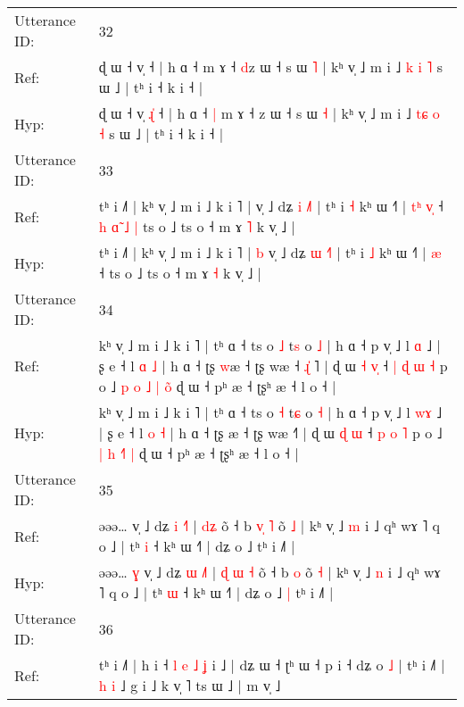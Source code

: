 \documentclass[10pt]{article}
\DeclareRobustCommand{\hl}[1]{{\textcolor{red}{#1}}}
\begin{document}
\begin{longtable}{ll}
 \\
\midrule
Utterance ID: & 32 \\
Ref: & ɖ ɯ ˧ v̩\hl{}\hl{}\hl{} ˧ | h ɑ ˧\hl{}\hl{} m ɤ ˧ \hl{d}z ɯ ˧ s ɯ \hl{˥} | kʰ v̩ ˩ m i ˩ \hl{}\hl{k} \hl{i} \hl{˥} s ɯ ˩ | tʰ i ˧ k i ˧ |
 \\
Hyp: & ɖ ɯ ˧ v̩\hl{ }\hl{ɻ}\hl{̍} ˧ | h ɑ ˧\hl{ }\hl{|} m ɤ ˧ \hl{}z ɯ ˧ s ɯ \hl{˧} | kʰ v̩ ˩ m i ˩ \hl{t}\hl{ɕ} \hl{o} \hl{˧} s ɯ ˩ | tʰ i ˧ k i ˧ |
 \\
\midrule
Utterance ID: & 33 \\
Ref: & tʰ i ˩˥ | kʰ v̩ ˩ m i ˩ k i ˥ |\hl{}\hl{} v̩ ˩ dʑ \hl{i} \hl{˩}˥ | tʰ i \hl{˧} kʰ ɯ ˧˥ |\hl{ }\hl{t}\hl{ʰ} \hl{v}\hl{̩} ˧\hl{ }\hl{h}\hl{ }\hl{ɑ}\hl{̃}\hl{ }\hl{˩}\hl{ }\hl{|} ts o ˩ ts o ˧ m ɤ \hl{˥} k v̩ ˩ |
 \\
Hyp: & tʰ i ˩˥ | kʰ v̩ ˩ m i ˩ k i ˥ |\hl{ }\hl{b} v̩ ˩ dʑ \hl{ɯ} \hl{˧}˥ | tʰ i \hl{˩} kʰ ɯ ˧˥ |\hl{}\hl{}\hl{} \hl{}\hl{æ} ˧\hl{}\hl{}\hl{}\hl{}\hl{}\hl{}\hl{}\hl{}\hl{} ts o ˩ ts o ˧ m ɤ \hl{˧} k v̩ ˩ |
 \\
\midrule
Utterance ID: & 34 \\
Ref: & kʰ v̩ ˩ m i ˩ k i ˥ | tʰ ɑ ˧ ts o \hl{˩} t\hl{s} o \hl{˩} | h ɑ ˧ p v̩ ˩ l \hl{}\hl{ɑ} ˩ | ʂ e ˧ l \hl{ɑ} \hl{˩} | h ɑ ˧ ʈʂ \hl{w}æ ˧ ʈʂ wæ ˧\hl{ }\hl{ɻ}\hl{̍}\hl{ }˥ | ɖ ɯ \hl{˧} \hl{v}\hl{̩} ˧\hl{ }\hl{|} \hl{ɖ} \hl{ɯ} \hl{˧} p o ˩ \hl{p} \hl{o} \hl{˩}\hl{ }\hl{|} \hl{o}\hl{̃} ɖ ɯ ˧ pʰ æ ˧ ʈʂʰ æ ˧ l o ˧ |
 \\
Hyp: & kʰ v̩ ˩ m i ˩ k i ˥ | tʰ ɑ ˧ ts o \hl{˧} t\hl{ɕ} o \hl{˧} | h ɑ ˧ p v̩ ˩ l \hl{w}\hl{ɤ} ˩ | ʂ e ˧ l \hl{o} \hl{˧} | h ɑ ˧ ʈʂ \hl{}æ ˧ ʈʂ wæ ˧\hl{}\hl{}\hl{}\hl{}˥ | ɖ ɯ \hl{ɖ} \hl{}\hl{ɯ} ˧\hl{}\hl{} \hl{p} \hl{o} \hl{˥} p o ˩ \hl{|} \hl{h} \hl{}\hl{˧}\hl{˥} \hl{}\hl{|} ɖ ɯ ˧ pʰ æ ˧ ʈʂʰ æ ˧ l o ˧ |
 \\
\midrule
Utterance ID: & 35 \\
Ref: & əəə…\hl{}\hl{} v̩ ˩ dʑ \hl{i} \hl{˧}˥ |\hl{}\hl{} \hl{}\hl{d}\hl{ʑ} õ ˧ b\hl{ }\hl{v}\hl{̩} \hl{˥} õ \hl{˩} | kʰ v̩ ˩ \hl{m} i ˩ qʰ wɤ ˥ q o ˩ | tʰ \hl{i} ˧ kʰ ɯ ˧˥ | dʑ o ˩\hl{}\hl{} tʰ i ˩˥ |
 \\
Hyp: & əəə…\hl{ }\hl{ɣ} v̩ ˩ dʑ \hl{ɯ} \hl{˩}˥ |\hl{ }\hl{ɖ} \hl{ɯ}\hl{ }\hl{˧} õ ˧ b\hl{}\hl{}\hl{} \hl{o} õ \hl{˧} | kʰ v̩ ˩ \hl{n} i ˩ qʰ wɤ ˥ q o ˩ | tʰ \hl{ɯ} ˧ kʰ ɯ ˧˥ | dʑ o ˩\hl{ }\hl{|} tʰ i ˩˥ |
 \\
\midrule
Utterance ID: & 36 \\
Ref: & tʰ i ˩˥ | h i ˧\hl{ }\hl{l}\hl{ }\hl{e}\hl{ }\hl{˩}\hl{ }\hl{ʝ} i ˩ | dʑ ɯ ˧ ʈʰ ɯ ˧\hl{}\hl{} p i ˧ dʑ o \hl{˩} | tʰ i ˩˥ |\hl{ }\hl{h}\hl{ }\hl{i} ˩ g i ˩ k v̩ ˥ ts ɯ ˩ | m v̩ ˩

\end{longtable}
\end{document}
